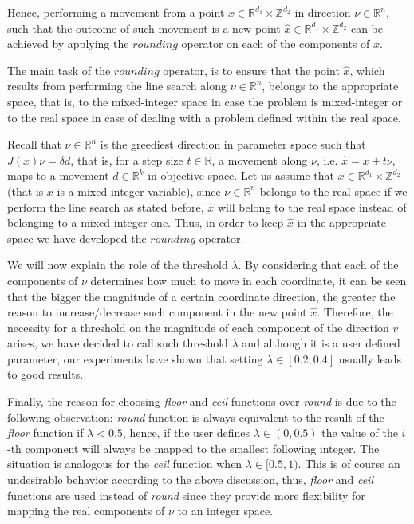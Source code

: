 Hence, performing a movement from a point $x \in \mathbb{R}^{d_1} \times \mathbb{Z}^{d_2}$  in direction $\nu \in \mathbb{R}^n$, such that the outcome of such movement is a new point $\hat{x} \in \mathbb{R}^{d_1} \times \mathbb{Z}^{d_2}$ can be achieved by applying the $rounding$ operator on each of the components of $x$.

The main task of the $rounding$ operator, is to ensure that the point $\hat{x}$, which results from performing the line search along $\nu \in \mathbb{R}^n$, belongs to the appropriate space, that is, to the mixed-integer space in case the problem is mixed-integer or to the real space in case of dealing with a problem defined within the real space. 

Recall that $\nu \in \mathbb{R}^n$ is the greediest direction in parameter space such that $J(x) \nu = \delta d$, that is, for a step size $t \in \mathbb{R}$, a movement along $\nu$, i.e. $\hat{x} = x + t \nu$, maps to a movement $d \in \mathbb{R}^k$ in objective space. Let us assume that $x \in \mathbb{R}^{d_1} \times \mathbb{Z}^{d_2}$ (that is $x$ is a mixed-integer variable), since $\nu \in \mathbb{R}^n$ belongs to the real space if we perform the line search as stated before, $\hat{x}$ will belong to the real space instead of belonging to a mixed-integer one. Thus, in order to keep $\hat{x}$ in the appropriate space we have developed the $rounding$ operator.

We will now explain the role of the threshold $\lambda$. By considering that each of the components of $\nu$ determines how much to move in each coordinate, it can be seen that the bigger the magnitude of a certain coordinate direction, the greater the reason to increase/decrease such component in the new point $\hat{x}$. Therefore, the necessity for a threshold on the magnitude of each component of the direction $v$ arises, we have decided to call such threshold $\lambda$ and although it is a user defined parameter, our experiments have shown that setting $\lambda \in [0.2, 0.4]$ usually leads to good results.

Finally, the reason for choosing \emph{floor} and \emph{ceil} functions over \emph{round} is due to the following observation: \emph{round} function is always equivalent to the result of the \emph{floor} function if  $\lambda < 0.5$, hence, if the user defines $\lambda \in (0, 0.5)$ the value of the $i$-th component will always be mapped to the smallest following integer. The situation is analogous for the \emph{ceil} function when $\lambda \in [0.5, 1)$. This is of course an undesirable behavior according to the above discussion, thus, \emph{floor} and \emph{ceil} functions are used instead of \emph{round} since they provide more flexibility for mapping the real components of $\nu$ to an integer space.\\

